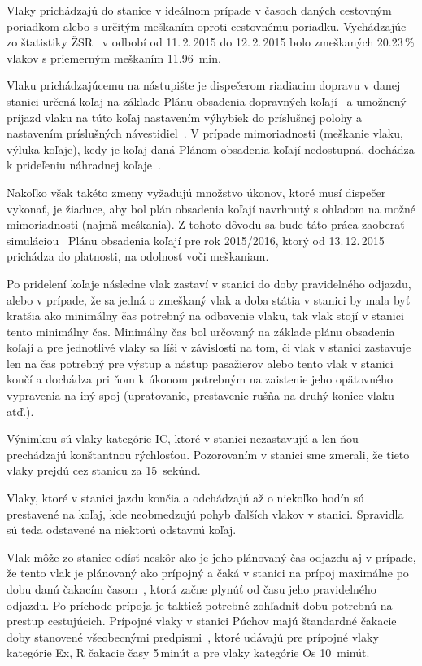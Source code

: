 \documentclass[12pt,a4paper,titlepage,final]{article}
\begin{document}
Vlaky prichádzajú do stanice v ideálnom prípade v časoch daných cestovným poriadkom alebo s určitým meškaním oproti cestovnému poriadku. Vychádzajúc zo štatistiky ŽSR~\cite{meskanie} v odbobí od 11.\,2.\,2015 do 12.\,2.\,2015 bolo zmeškaných 20.23\,\% vlakov s priemerným meškaním 11.96~min.

Vlaku prichádzajúcemu na nástupište je dispečerom riadiacim dopravu v danej stanici
určená koľaj na základe Plánu obsadenia dopravných koľají~\cite{pok} a umožnený
príjazd vlaku na túto koľaj nastavením výhybiek do príslušnej polohy a nastavením
príslušných návestidiel~\cite{riadenie}. V prípade mimoriadnosti (meškanie vlaku, výluka koľaje),
kedy je koľaj daná Plánom obsadenia koľají nedostupná, dochádza k prideľeniu náhradnej
koľaje~\cite{dispecer}.

Nakoľko však takéto zmeny vyžadujú množstvo úkonov, ktoré musí dispečer vykonať,
je žiaduce, aby bol plán obsadenia koľají navrhnutý s ohľadom na možné mimoriadnosti (najmä meškania). Z tohoto dôvodu sa bude táto práca
zaoberať simuláciou~\cite[str.\,7]{opora} Plánu obsadenia koľají pre rok 2015/2016, ktorý od 13.\,12.\,2015 prichádza
do platnosti, na odolnosť voči meškaniam.

Po pridelení koľaje následne vlak zastaví v stanici do doby pravidelného odjazdu, alebo
v prípade, že sa jedná o zmeškaný vlak a doba státia v stanici by mala byť kratšia ako minimálny čas potrebný na odbavenie vlaku, tak vlak stojí v stanici tento minimálny čas. Minimálny čas bol určovaný na základe
plánu obsadenia koľají a pre jednotlivé vlaky sa líši v závislosti na tom, či vlak v stanici
zastavuje len na čas potrebný pre výstup a nástup pasažierov alebo tento vlak v stanici končí a
dochádza pri ňom k úkonom potrebným na zaistenie jeho opätovného vypravenia na iný spoj (upratovanie, prestavenie rušňa na druhý koniec vlaku atď.).

Výnimkou sú vlaky kategórie IC, ktoré v stanici nezastavujú a len ňou prechádzajú konštantnou rýchlosťou.
Pozorovaním v stanici sme zmerali, že tieto vlaky prejdú cez stanicu za 15~sekúnd.

Vlaky, ktoré v stanici jazdu končia a odchádzajú až o niekoľko hodín sú prestavené na koľaj,
kde neobmedzujú pohyb ďalších vlakov v stanici. Spravidla sú teda odstavené na
niektorú odstavnú koľaj.

Vlak môže zo stanice odísť neskôr ako je jeho plánovaný čas odjazdu aj v prípade,
že tento vlak je plánovaný ako prípojný a čaká v stanici na prípoj maximálne po
dobu danú čakacím časom~\cite[str.\,3]{pripoje}, ktorá začne plynúť od času jeho pravidelného odjazdu.
Po príchode prípoja je taktiež potrebné zohľadniť dobu potrebnú na prestup
cestujúcich. Prípojné vlaky v stanici Púchov majú štandardné čakacie doby stanovené
všeobecnými predpismi~\cite{pripoje}, ktoré udávajú pre prípojné vlaky kategórie Ex, R čakacie
časy 5\,minút a pre vlaky kategórie Os 10~minút.
\end{document}
